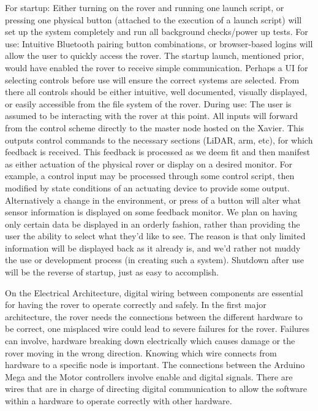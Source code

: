 \documentclass[a4paper, 10pt]{article}
\begin{document}
	For startup: Either turning on the rover and running one launch script, or pressing one physical button (attached to the execution of a launch script) will set up the system completely and run all background checks/power up tests. 
For use: Intuitive Bluetooth pairing button combinations, or browser-based logins will allow the user to quickly access the rover. The startup launch, mentioned prior, would have enabled the rover to receive simple communication. Perhaps a UI for selecting controls before use will ensure the correct systems are selected. From there all controls should be either intuitive, well documented, visually displayed, or easily accessible from the file system of the rover. 
During use: The user is assumed to be interacting with the rover at this point. All inputs will forward from the control scheme directly to the master node hosted on the Xavier. This outputs control commands to the necessary sections (LiDAR, arm, etc), for which feedback is received. This feedback is processed as we deem fit and then manifest as either actuation of the physical rover or display on a desired monitor. For example, a control input may be processed through some control script, then modified by state conditions of an actuating device to provide some output. Alternatively a change in the environment, or press of a button will alter what sensor information is displayed on some feedback monitor. We plan on having only certain data be displayed in an orderly fashion, rather than providing the user the ability to select what they'd like to see. The reason is that only limited information will be displayed back as it already is, and we'd rather not muddy the use or development process (in creating such a system). Shutdown after use will be the reverse of startup, just as easy to accomplish.

On the Electrical Architecture, digital wiring between components are essential for having the rover to operate correctly and safely. In the first major architecture, the rover needs the connections between the different hardware to be correct, one misplaced wire could lead to severe failures for the rover. Failures can involve, hardware breaking down electrically which causes damage or the rover moving in the wrong direction. Knowing which wire connects from hardware to a specific node is important. The connections between the Arduino Mega and the Motor controllers involve enable and digital signals. There are wires that are in charge of directing digital communication to allow the software within a hardware to operate correctly with other hardware. 
\end{document}
